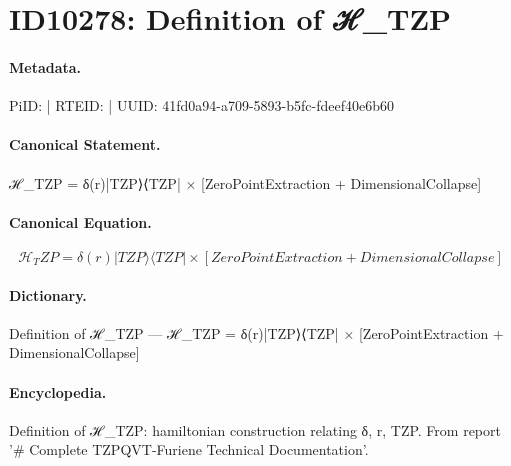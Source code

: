 \section*{ID10278: Definition of ℋ\_TZP}
\paragraph{Metadata.}
PiID:  | RTEID:  | UUID: 41fd0a94-a709-5893-b5fc-fdeef40e6b60

\paragraph{Canonical Statement.}
ℋ\_TZP = δ(r)|TZP⟩⟨TZP| × [ZeroPointExtraction + DimensionalCollapse]

\paragraph{Canonical Equation.}
\[
ℋ_TZP = δ(r)|TZP⟩⟨TZP| × [ZeroPointExtraction + DimensionalCollapse]
\]

\paragraph{Dictionary.}
Definition of ℋ\_TZP — ℋ\_TZP = δ(r)|TZP⟩⟨TZP| × [ZeroPointExtraction + DimensionalCollapse]

\paragraph{Encyclopedia.}
Definition of ℋ\_TZP: hamiltonian construction relating δ, r, TZP. From report '\# Complete TZPQVT-Furiene Technical Documentation'.
